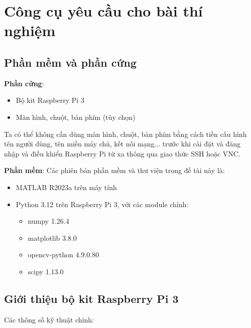 \section{Công cụ yêu cầu cho bài thí nghiệm}

\subsection{Phần mềm và phần cứng}

\textbf{Phần cứng}:
\begin{itemize}
    \item Bộ kit Raspberry Pi 3
    \item Màn hình, chuột, bàn phím (tùy chọn)
\end{itemize}

Ta có thể không cần dùng màn hình, chuột, bàn phím 
bằng cách tiền cấu hình tên người dùng, tên miền máy chủ, kết nối mạng... trước khi cài đặt 
và đăng nhập và điều khiển Raspberry Pi từ xa thông qua giao thức SSH hoặc VNC.

\textbf{Phần mềm}: Các phiên bản phần mềm và thư viện trong đề tài này là:
\begin{itemize}
    \item MATLAB R2023a trên máy tính
    \item Python 3.12 trên Raspberry Pi 3, với các module chính:
    \begin{itemize}
        \item numpy 1.26.4
        \item matplotlib 3.8.0
        \item opencv-python 4.9.0.80
        \item scipy 1.13.0
    \end{itemize}
\end{itemize}

\subsection{Giới thiệu bộ kit Raspberry Pi 3}

Các thông số kỹ thuật chính:

